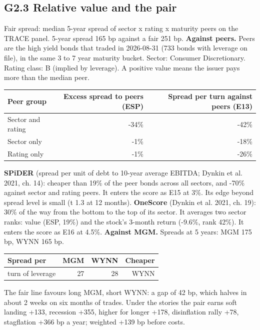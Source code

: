 \documentclass[11pt,a4paper]{article}
\begin{document}
\subsection*{G2.3 Relative value and the pair}
Fair spread: median 5-year spread of sector x rating x maturity peers on the TRACE panel. 5-year spread 165 bp against a fair 251 bp.
\textbf{Against peers.} Peers are the high yield bonds that traded in 2026-08-31 (733 bonds with leverage on file), in the same 3 to 7 year maturity bucket. Sector: Consumer Discretionary. Rating class: B (implied by leverage). A positive value means the issuer pays more than the median peer.
\begin{center}\footnotesize\setlength{\tabcolsep}{3.5pt}\begin{tabular}{@{}lrr@{}}\toprule
Peer group & Excess spread to peers (ESP) & Spread per turn against peers (E13) \\\midrule
Sector and rating & -34\% & -42\% \\
Sector only & -1\% & -18\% \\
Rating only & -1\% & -26\% \\
\bottomrule\end{tabular}\end{center}
\textbf{SPiDER} (spread per unit of debt to 10-year average EBITDA; Dynkin et al. 2021, ch. 14): cheaper than 19\% of the peer bonds across all sectors, and -70\% against sector and rating peers. It enters the score as E15 at 3\%. Its edge beyond spread level is small (t 1.3 at 12 months).
\textbf{OneScore} (Dynkin et al. 2021, ch. 19): 30\% of the way from the bottom to the top of its sector. It averages two sector ranks: value (ESP, 19\%) and the stock's 3-month return (-9.6\%, rank 42\%). It enters the score as E16 at 4.5\%.
\textbf{Against MGM.} Spreads at 5 years: MGM 175 bp, WYNN 165 bp.
\begin{center}\footnotesize\setlength{\tabcolsep}{3.5pt}\begin{tabular}{@{}lrrr@{}}\toprule
Spread per & MGM & WYNN & Cheaper \\\midrule
turn of leverage & 27 & 28 & WYNN \\
\bottomrule\end{tabular}\end{center}
The fair line favours long MGM, short WYNN: a gap of 42 bp, which halves in about 2 weeks on six months of trades. Under the stories the pair earns soft landing +133, recession +355, higher for longer +178, disinflation rally +78, stagflation +366 bp a year; weighted +139 bp before costs.
\end{document}
